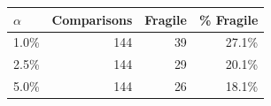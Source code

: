 \begin{tabular}{lrrr}
\toprule
$\alpha$ & Comparisons & Fragile & \% Fragile \\
\midrule
  1.0\% & 144 & 39 & 27.1\% \\
  2.5\% & 144 & 29 & 20.1\% \\
  5.0\% & 144 & 26 & 18.1\% \\
\bottomrule
\end{tabular}